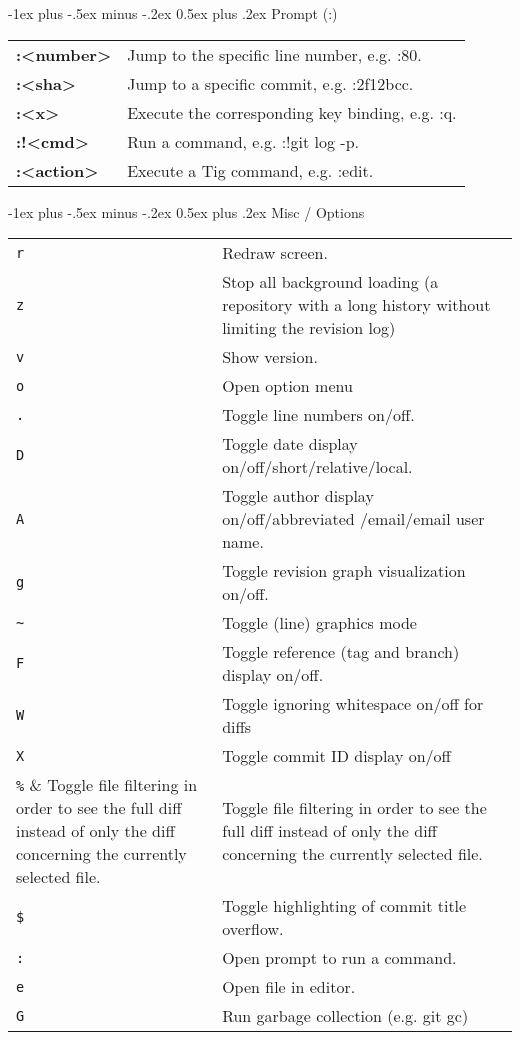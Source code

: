 \documentclass[a4paper,10pt,landscape]{article}
\makeatletter
\renewcommand{\section}{\@startsection{section}{1}{0mm}%
                                {-1ex plus -.5ex minus -.2ex}%
                                {0.5ex plus .2ex}%
                                {\normalfont\large\bfseries}}
\makeatother
\begin{document}
\begin{multicols}{3}
\section{Prompt (:)}
\begin{tabular}{@{}ll@{}}
\textbf{:\textless number\textgreater} & Jump to the specific line number, e.g. :80. \\
\textbf{:\textless sha\textgreater} & Jump to a specific commit, e.g. :2f12bcc. \\
\textbf{:\textless x\textgreater} & Execute the corresponding key binding, e.g. :q. \\
\textbf{:!\textless cmd\textgreater} & Run a command, e.g. :!git log -p. \\
\textbf{:\textless action\textgreater} & Execute a Tig command, e.g. :edit. \\
\end{tabular}

\section{Misc / Options}
\begin{tabular}{@{}lp{6.5cm}@{}}
\verb!r! & Redraw screen. \\
\verb!z! & Stop all background loading (a repository with a long history without limiting the revision log) \\
\verb!v! & Show version. \\
\verb!o! & Open option menu \\
\verb!.! & Toggle line numbers on/off. \\
\verb!D! & Toggle date display on/off/short/relative/local. \\
\verb!A! & Toggle author display on/off/abbreviated /email/email user name. \\
\verb!g! & Toggle revision graph visualization on/off. \\
\verb!~! & Toggle (line) graphics mode \\
\verb!F! & Toggle reference (tag and branch) display on/off. \\
\verb!W! & Toggle ignoring whitespace on/off for diffs \\
\verb!X! & Toggle commit ID display on/off \\
\verb!%! & Toggle file filtering in order to see the full diff instead of only the diff concerning the currently selected file. \\
\verb!$! & Toggle highlighting of commit title overflow. \\
\verb!:! & Open prompt to run a command. \\
\verb!e! & Open file in editor. \\
\verb!G! & Run garbage collection (e.g. git gc) \\
\end{tabular}


\end{multicols}
\end{document}
